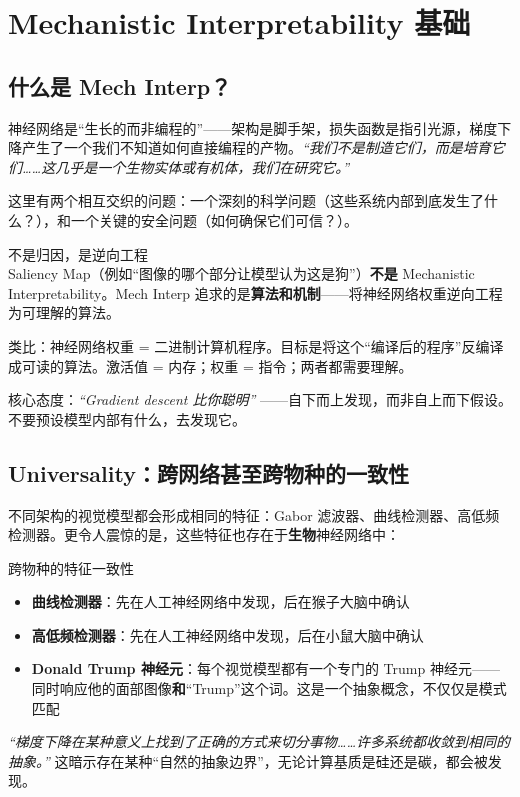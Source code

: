 \documentclass[a4paper]{article}
\begin{document}
\section{Mechanistic Interpretability 基础}

\subsection{什么是 Mech Interp？}

神经网络是``生长的而非编程的''——架构是脚手架，损失函数是指引光源，梯度下降产生了一个我们不知道如何直接编程的产物。\textit{``我们不是制造它们，而是培育它们……这几乎是一个生物实体或有机体，我们在研究它。''}

这里有两个相互交织的问题：一个深刻的科学问题（这些系统内部到底发生了什么？），和一个关键的安全问题（如何确保它们可信？）。

\begin{importantbox}{不是归因，是逆向工程}
Saliency Map（例如``图像的哪个部分让模型认为这是狗''）\textbf{不是} Mechanistic Interpretability。Mech Interp 追求的是\textbf{算法和机制}——将神经网络权重逆向工程为可理解的算法。

类比：神经网络权重 = 二进制计算机程序。目标是将这个``编译后的程序''反编译成可读的算法。激活值 = 内存；权重 = 指令；两者都需要理解。

核心态度：\textit{``Gradient descent 比你聪明''} ——自下而上发现，而非自上而下假设。不要预设模型内部有什么，去发现它。
\end{importantbox}

\subsection{Universality：跨网络甚至跨物种的一致性}

不同架构的视觉模型都会形成相同的特征：Gabor 滤波器、曲线检测器、高低频检测器。更令人震惊的是，这些特征也存在于\textbf{生物}神经网络中：

\begin{knowledgebox}{跨物种的特征一致性}
\begin{itemize}
    \item \textbf{曲线检测器}：先在人工神经网络中发现，后在猴子大脑中确认
    \item \textbf{高低频检测器}：先在人工神经网络中发现，后在小鼠大脑中确认
    \item \textbf{Donald Trump 神经元}：每个视觉模型都有一个专门的 Trump 神经元——同时响应他的面部图像\textbf{和}``Trump''这个词。这是一个抽象概念，不仅仅是模式匹配
\end{itemize}

\textit{``梯度下降在某种意义上找到了正确的方式来切分事物……许多系统都收敛到相同的抽象。''} 这暗示存在某种``自然的抽象边界''，无论计算基质是硅还是碳，都会被发现。
\end{knowledgebox}
\end{document}
